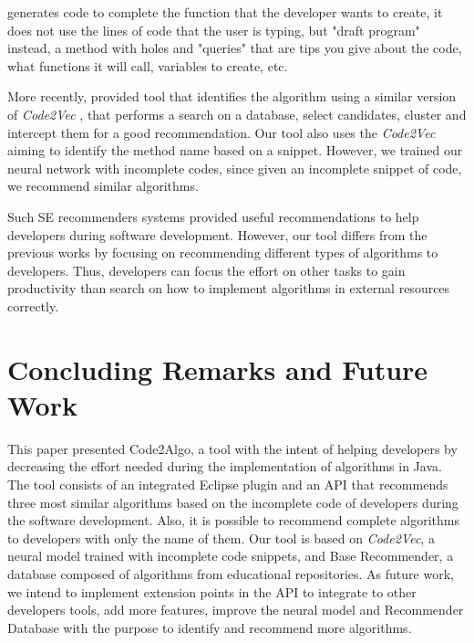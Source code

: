 \documentclass[12pt]{article}
\begin{document}
\cite{Vijayaraghavan2017Bayou} generates code to complete the function that the developer wants to create, it does not use the lines of code that the user is typing, but "draft program" instead, a method with holes and "queries" that are tips you give about the code, what functions it will call, variables to create, etc. 

More recently, \cite{Luan2018Aroma} provided tool that identifies the algorithm using a similar version of \textit{Code2Vec} \cite{Alon2018Code2vec}, that performs a search on a database, select candidates, cluster and intercept them for a good recommendation. Our tool also uses the \textit{Code2Vec} aiming to identify the method name based on a snippet. However, we trained our neural network with incomplete codes, since given an incomplete snippet of code, we recommend similar algorithms.

Such SE recommenders systems provided useful recommendations to help developers during software development. However, our tool differs from the previous works by focusing on recommending different types of algorithms to developers. Thus, developers can focus the effort on other tasks to gain productivity than search on how to implement algorithms in external resources correctly. 


\section{Concluding Remarks and Future Work}
\label{sec:conclusion}

This paper presented Code2Algo, a tool with the intent of helping developers by decreasing the effort needed during the implementation of algorithms in Java. The tool consists of an integrated Eclipse plugin and an API that recommends three most similar algorithms based on the incomplete code of developers during the software development. Also, it is possible to recommend complete algorithms to developers with only the name of them. Our tool is based on \textit{Code2Vec}, a neural model trained with incomplete code snippets, and Base Recommender, a database composed of algorithms from educational repositories. As future work, we intend to implement extension points in the API to integrate to other developers tools, add more features, improve the neural model and Recommender Database with the purpose to identify and recommend more algorithms.



\end{document}
